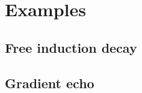 \documentclass{article}
\begin{document}
\newpage
\section{Examples}

\subsection{Free induction decay}



\subsection{Gradient echo}


\end{document}
